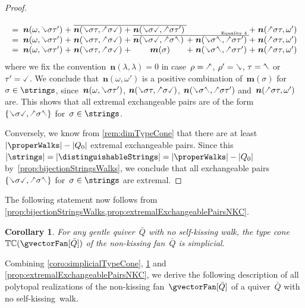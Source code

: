 \documentclass{amsart}
\newtheorem{corollary}[theorem]{Corollary}
\theoremstyle{definition}
\renewcommand{\b}[1]{{\boldsymbol{#1}}} %
\newcommand{\typeCone}{\mathbb{TC}} %
\newcommand{\quiver}{\bar Q} %
\newcommand{\hL}{\text{\rotatebox[origin=c]{180}{\checked}}}
\newcommand{\hR}{\text{\rotatebox[origin=c]{180}{\reflectbox{\checked}}}}
\newcommand{\cL}{\text{\reflectbox{\checked}}}
\newcommand{\cR}{\text{\checked}}
\newcommand{\hh}[1]{\hL#1\hR} %
\newcommand{\cc}[1]{\cL#1\cR} %
\begin{document}
\begin{proof}
\[\begin{array}[t]{l@{\;\;}l@{\;}l@{\;}l@{\;}l@{\;}l@{\;}l@{\;}l@{\;}l@{\;}l}
\cline{4-6}
= & \b{n}(\omega, \cL \sigma \tau') & + & \b{n}(\cL \sigma \tau, \hL \sigma \cR) & + & \b{n}(\cL \sigma \cR, \hL \sigma \tau') & & \hfill\raisebox{-.1cm}{\text{\tiny{Equality 4}}} & + & \b{n}(\hL \sigma \tau, \omega') \\
\cline{6-8}
= & \b{n}(\omega, \cL \sigma \tau') & + & \b{n}(\cL \sigma \tau, \hL \sigma \cR) & + & \b{n}(\cL \sigma \cR, \hL \sigma \hR) & + & \b{n}(\cL \sigma \hR, \hL \sigma \tau') & + & \b{n}(\hL \sigma \tau, \omega') \\
= & \b{n}(\omega, \cL \sigma \tau') & + & \b{n}(\cL \sigma \tau, \hL \sigma \cR) & + & \multicolumn{1}{c}{\b{m}(\sigma)} & + & \b{n}(\cL \sigma \hR, \hL \sigma \tau') & + & \b{n}(\hL \sigma \tau, \omega')
\end{array}
\renewcommand{\arraystretch}{1}
\]
where we fix the convention~$\b{n}(\lambda, \lambda) = 0$ in case~$\rho = \hL$, $\rho' = \cL$, $\tau = \hR$ or~$\tau' = \cR$.
%
We conclude that~$\b{n}(\omega, \omega')$ is a positive combination of~$\b{m}(\sigma)$ for~$\sigma \in \strings$, since~$\b{n}(\omega, \cL \sigma \tau')$, $\b{n}(\cL \sigma \tau, \hL \sigma \cR)$, $\b{n}(\cL \sigma \hR, \hL \sigma \tau')$ and~$\b{n}(\hL \sigma \tau, \omega')$ are.
This shows that all extremal exchangeable pairs are of the form~$\{\cc{\sigma}, \hh{\sigma}\}$ for~$\sigma \in \strings$.

Conversely, we know from \cref{rem:dimTypeCone} that there are at least~$|\properWalks|-|Q_0|$ extremal exchangeable pairs. Since this~$|\strings| = |\distinguishableStrings| = |\properWalks| - |Q_0|$ by~\cref{prop:bijectionStringsWalks}, we conclude that all exchangeable pairs~$\{\cc{\sigma}, \hh{\sigma}\}$ for~$\sigma \in \strings$ are extremal.
\end{proof}

The following statement now follows from \cref{prop:bijectionStringsWalks,prop:extremalExchangeablePairsNKC}.

\begin{corollary}
\label{coro:simplicialTypeConeNKC}
For any gentle quiver~$\quiver$ with no self-kissing walk, the type cone~$\typeCone(\gvectorFan[\quiver])$ of the non-kissing fan~$\quiver$ is simplicial.
\end{corollary}

Combining \cref{coro:simplicialTypeCone}, \cref{coro:simplicialTypeConeNKC} and \cref{prop:extremalExchangeablePairsNKC}, we derive the following description of all polytopal realizations of the non-kissing fan~$\gvectorFan[\quiver]$ of a quiver~$\quiver$ with no self-kissing~walk.
\end{document}
